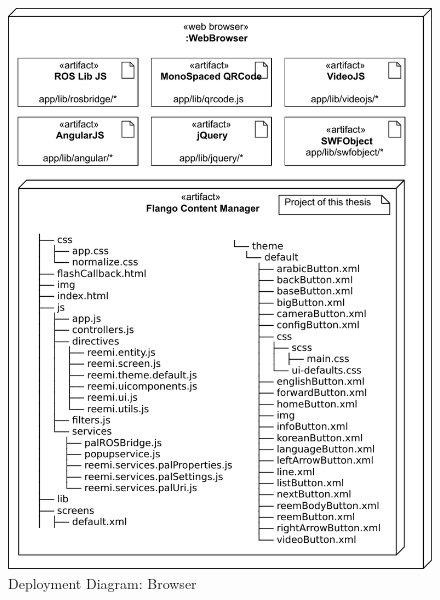 \begin{figure}[htb]
    \centering
    \includegraphics{figures/design-deployment-browser.pdf}
    \caption{Deployment Diagram: Browser}
    \label{fig:deploy-browser}
\end{figure}

